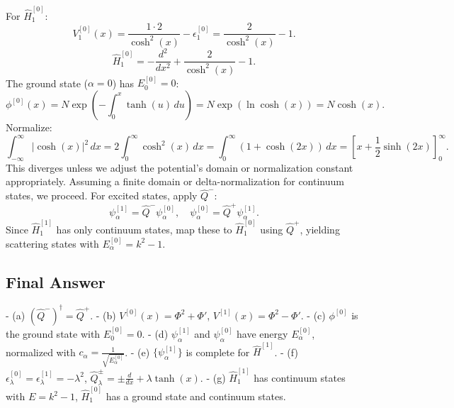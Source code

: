 \documentclass[a4paper,12pt]{article}
\begin{document}
For \(\hat{H}_1^{[0]}\):
\[
V_1^{[0]}(x) = \frac{1 \cdot 2}{\cosh^2(x)} - \epsilon_1^{[0]} = \frac{2}{\cosh^2(x)} - 1.
\]
\[
\hat{H}_1^{[0]} = -\frac{d^2}{dx^2} + \frac{2}{\cosh^2(x)} - 1.
\]
The ground state (\(\alpha = 0\)) has \(E_0^{[0]} = 0\):
\[
\phi^{[0]}(x) = N \exp \left( -\int_0^x \tanh(u) \, du \right) = N \exp \left( \ln \cosh(x) \right) = N \cosh(x).
\]
Normalize:
\[
\int_{-\infty}^\infty |\cosh(x)|^2 \, dx = 2 \int_0^\infty \cosh^2(x) \, dx = \int_0^\infty (1 + \cosh(2x)) \, dx = \left[ x + \frac{1}{2} \sinh(2x) \right]_0^\infty.
\]
This diverges unless we adjust the potential’s domain or normalization constant appropriately. Assuming a finite domain or delta-normalization for continuum states, we proceed. For excited states, apply \(\hat{Q}^-\):
\[
\psi_\alpha^{[1]} = \hat{Q}^- \psi_\alpha^{[0]}, \quad \psi_\alpha^{[0]} = \hat{Q}^+ \psi_\alpha^{[1]}.
\]
Since \(\hat{H}_1^{[1]}\) has only continuum states, map these to \(\hat{H}_1^{[0]}\) using \(\hat{Q}^+\), yielding scattering states with \(E_\alpha^{[0]} = k^2 - 1\).

\subsection*{Final Answer}

- (a) \((\hat{Q}^-)^\dagger = \hat{Q}^+\).
- (b) \(V^{[0]}(x) = \Phi^2 + \Phi'\), \(V^{[1]}(x) = \Phi^2 - \Phi'\).
- (c) \(\phi^{[0]}\) is the ground state with \(E_0^{[0]} = 0\).
- (d) \(\psi_\alpha^{[1]}\) and \(\psi_\alpha^{[0]}\) have energy \(E_\alpha^{[0]}\), normalized with \(c_\alpha = \frac{1}{\sqrt{E_\alpha^{[0]}}}\).
- (e) \(\{\psi_\alpha^{[1]}\}\) is complete for \(\hat{H}^{[1]}\).
- (f) \(\epsilon_\lambda^{[0]} = \epsilon_\lambda^{[1]} = -\lambda^2\), \(\hat{Q}_\lambda^\pm = \pm \frac{d}{dx} + \lambda \tanh(x)\).
- (g) \(\hat{H}_1^{[1]}\) has continuum states with \(E = k^2 - 1\), \(\hat{H}_1^{[0]}\) has a ground state and continuum states.
\end{document}
